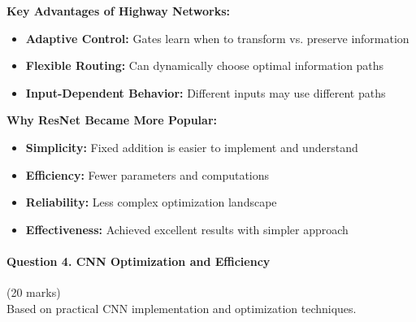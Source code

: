 \documentclass[12pt]{article}
\begin{document}
\begin{enumerate}[(a)]
{    \textbf{Key Advantages of Highway Networks:}
    \begin{itemize}
        \item \textbf{Adaptive Control:} Gates learn when to transform vs. preserve information
        \item \textbf{Flexible Routing:} Can dynamically choose optimal information paths
        \item \textbf{Input-Dependent Behavior:} Different inputs may use different paths
    \end{itemize}
    
    \textbf{Why ResNet Became More Popular:}
    \begin{itemize}
        \item \textbf{Simplicity:} Fixed addition is easier to implement and understand
        \item \textbf{Efficiency:} Fewer parameters and computations
        \item \textbf{Reliability:} Less complex optimization landscape
        \item \textbf{Effectiveness:} Achieved excellent results with simpler approach
    \end{itemize}
    }
\end{enumerate}

\newpage
\paragraph{Question 4. CNN Optimization and Efficiency}\hfill (20 marks)\\
Based on practical CNN implementation and optimization techniques.
\end{document}
